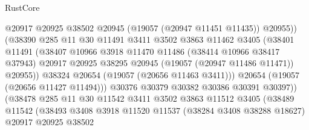 \begin{lexlean}{RustCore}
\begin{coremodule}
                                    @20917
                                    @20925
                                    @38502
                                    @20945
                                    (@19057 (@20947 @11451 @11435))
                                    @20955))
                                (@38390
                                  @285
                                  @11
                                  @30
                                  @11491
                                  @3411
                                  @3502
                                  @3863
                                  @11462
                                  @3405
                                  (@38401
                                    @11491
                                    (@38407
                                      @10966
                                      @3918
                                      @11470
                                      @11486
                                      (@38414 @10966 @38417 @37943)
                                      @20917
                                      @20925
                                      @38295
                                      @20945
                                      (@19057 (@20947 @11486 @11471))
                                      @20955))
                                  @38324
                                  @20654
                                  (@19057 (@20656 @11463 @3411)))
                                @20654
                                (@19057 (@20656 @11427 @11494)))
                              @30376
                              @30379
                              @30382
                              @30386
                              @30391
                              @30397))
                          (@38478
                            @285
                            @11
                            @30
                            @11542
                            @3411
                            @3502
                            @3863
                            @11512
                            @3405
                            (@38489
                              @11542
                              (@38493
                                @3408
                                @3918
                                @11520
                                @11537
                                (@38284 @3408 @38288 @18627)
                                @20917
                                @20925
                                @38502

\end{coremodule}
\end{lexlean}
